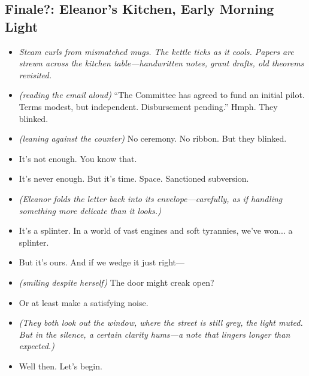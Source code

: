 \newpage
\subsection*{Finale?: Eleanor’s Kitchen, Early Morning Light}

\begin{itemize}[leftmargin=1.5cm]

\item[] \textit{Steam curls from mismatched mugs. The kettle ticks as it cools. Papers are strewn across the kitchen table—handwritten notes, grant drafts, old theorems revisited.}

\item[Eleanor:] \textit{(reading the email aloud)} “The Committee has agreed to fund an initial pilot. Terms modest, but independent. Disbursement pending.” Hmph. They blinked.

\item[Nina:] \textit{(leaning against the counter)} No ceremony. No ribbon. But they blinked.

\item[Eleanor:] It’s not enough. You know that.

\item[Nina:] It’s never enough. But it’s time. Space. Sanctioned subversion.

\item[] \textit{(Eleanor folds the letter back into its envelope—carefully, as if handling something more delicate than it looks.)}

\item[Eleanor:] It’s a splinter. In a world of vast engines and soft tyrannies, we’ve won... a splinter.

\item[Nina:] But it's ours. And if we wedge it just right—

\item[Eleanor:] \textit{(smiling despite herself)} The door might creak open?

\item[Nina:] Or at least make a satisfying noise.

\item[] \textit{(They both look out the window, where the street is still grey, the light muted. But in the silence, a certain clarity hums—a note that lingers longer than expected.)}

\item[Eleanor:] Well then. Let’s begin.

\end{itemize}







